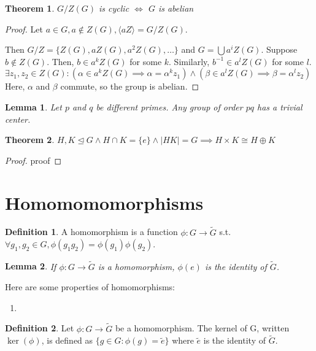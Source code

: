 \documentclass{article}
\theoremstyle{definition}
\newtheorem{definition}{Definition}
\theoremstyle{plain}
\newtheorem{theorem}{Theorem}
\theoremstyle{corollary}
\theoremstyle{lemma}
\newtheorem{lemma}{Lemma}
\begin{document}
\begin{theorem}
$G/Z(G)$ is cyclic $\iff$ $G$ is abelian
\end{theorem}

\begin{proof}
Let $a\in G, a\notin Z(G), \langle aZ\rangle=G/Z(G)$.

Then $G/Z=\{Z(G),aZ(G),a^2Z(G),\dots\}$ and $G=\bigcup a^iZ(G)$.
Suppose $b\notin Z(G)$. Then, $b\in a^kZ(G)$ for some $k$. Similarly, $b^{-1}\in a^lZ(G)$ for some $l$.
$\exists z_1,z_2\in Z(G):(\alpha\in a^kZ(G)\implies\alpha=\alpha^kz_1)\land(\beta\in a^lZ(G)\implies\beta = \alpha^lz_2)$
Here, $\alpha$ and $\beta$ commute, so the group is abelian.
\end{proof}

\begin{lemma}
Let $p$ and $q$ be different primes. Any group of order $pq$ has a trivial center.
\end{lemma}

\begin{theorem}
$H,K\unlhd G\land H\cap K = \{e\}\land |HK|=G\implies H\times K\cong H\oplus K$
\end{theorem}

\begin{proof}
    proof
\end{proof}

\section{Homomomomorphisms}

\begin{definition}
A homomorphism is a function $\phi:G\rightarrow\tilde{G}$ s.t. $\forall g_1,g_2\in G,\phi(g_1g_2)=\phi(g_1)\phi(g_2)$.
\end{definition}

\begin{lemma}
If $\phi:G\rightarrow\tilde{G}$ is a homomorphism, $\phi(e)$ is the identity of $\tilde{G}$.
\end{lemma}

Here are some properties of homomorphisms:
\begin{enumerate}
    \item 
\end{enumerate}

\begin{definition}
Let $\phi:G\rightarrow\tilde{G}$ be a homomorphism. The kernel of G, written $\ker(\phi)$, is defined as $\{g\in G:\phi(g)=\tilde e\}$ where $\tilde e$ is the identity of $\tilde G$.
\end{definition}
\end{document}
